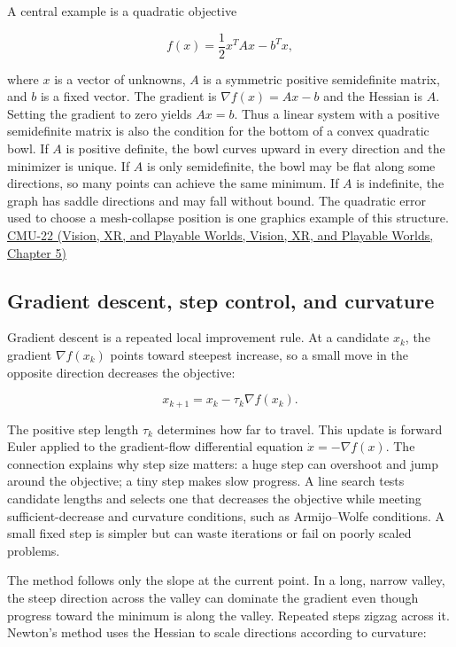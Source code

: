 A central example is a quadratic objective

\[
f(x)=\frac12 x^T A x-b^T x,
\]

where \(x\) is a vector of unknowns, \(A\) is a symmetric positive semidefinite matrix, and \(b\) is a fixed vector. The gradient is \(\nabla f(x)=Ax-b\) and the Hessian is \(A\). Setting the gradient to zero yields \(Ax=b\). Thus a linear system with a positive semidefinite matrix is also the condition for the bottom of a convex quadratic bowl. If \(A\) is positive definite, the bowl curves upward in every direction and the minimizer is unique. If \(A\) is only semidefinite, the bowl may be flat along some directions, so many points can achieve the same minimum. If \(A\) is indefinite, the graph has saddle directions and may fall without bound. The quadratic error used to choose a mesh-collapse position is one graphics example of this structure. \href{../07-Vision-XR-and-Playable-Worlds/main.pdf\#nameddest=04-visual-computing-ii-ch036-cmu-22---optimization}{CMU-22 (Vision, XR, and Playable Worlds, Vision, XR, and Playable Worlds, Chapter 5)}

\subsection{Gradient descent, step control, and curvature}\label{04-visual-computing-ii-ch029-gradient-descent-step-control-and-curvature}

Gradient descent is a repeated local improvement rule. At a candidate \(x_k\), the gradient \(\nabla f(x_k)\) points toward steepest increase, so a small move in the opposite direction decreases the objective:

\[
x_{k+1}=x_k-\tau_k\nabla f(x_k).
\]

The positive step length \(\tau_k\) determines how far to travel. This update is forward Euler applied to the gradient-flow differential equation \(\dot x=-\nabla f(x)\). The connection explains why step size matters: a huge step can overshoot and jump around the objective; a tiny step makes slow progress. A line search tests candidate lengths and selects one that decreases the objective while meeting sufficient-decrease and curvature conditions, such as Armijo--Wolfe conditions. A small fixed step is simpler but can waste iterations or fail on poorly scaled problems.

The method follows only the slope at the current point. In a long, narrow valley, the steep direction across the valley can dominate the gradient even though progress toward the minimum is along the valley. Repeated steps zigzag across it. Newton's method uses the Hessian to scale directions according to curvature:


